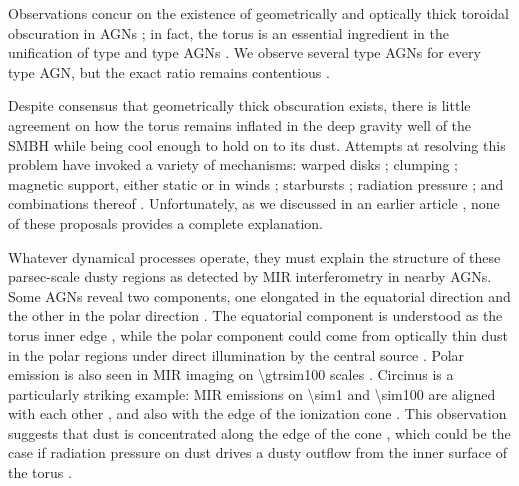 \documentclass[twocolumn]{article}
\newcommand*\citepaliasfirst[1]{%
  \citetext{\citealp{#1}\postnotedelim
  \bibstring{citedas}\addspace\citetalias{#1}}}
\begin{document}
Observations concur on the existence of geometrically and optically thick
toroidal obscuration in \acp{AGN} \citep[e.g.,][]{1985ApJ...297..621A,
1990ApJ...355..456M}; in fact, the torus is an essential ingredient in the
unification of type and type \acp{AGN}
\citep[e.g.,][]{1989ApJ...336..606B, 1993ARA&A..31..473A, 1995PASP..107..803U}.
We observe several type \acp{AGN} for every type
\ac{AGN}, but the exact ratio remains contentious
\citep[e.g.,][]{2008A&A...490..905H, 2010ApJ...714..561L}.

Despite consensus that geometrically thick obscuration exists, there is little
agreement on how the torus remains inflated in the deep gravity well of the
\ac{SMBH} while being cool enough to hold on to its dust. Attempts at resolving
this problem have invoked a variety of mechanisms: warped disks
\citep[e.g.,][]{1989tad..conf..457P, 1989ApJ...347...29S}; clumping
\citep{1988ApJ...329..702K}; magnetic support, either static
\citep{1998A&A...338..856L} or in winds \citep[e.g.,][]{1994ApJ...434..446K,
2006ApJ...648L.101E}; starbursts \citep[e.g.,][]{2009MNRAS.393..759S,
2009ApJ...702...63W}; radiation pressure
\citetext{\citealp[e.g.,][]{1992ApJ...399L..23P, 2008ApJ...679.1018S,
2015ApJ...812...82W, 2016ApJ...819..115D}\multicitedelim\citealp[but
see][]{2016MNRAS.460..980N}}; and combinations thereof
\citep{2012ApJ...749...32K, 2016ApJ...828L..19W}. Unfortunately, as we
discussed in an earlier article \citepaliasfirst{2016ApJ...825...67C}, none of
these proposals provides a complete explanation.

Whatever dynamical processes operate, they must explain the structure of these
parsec-scale dusty regions as detected by \ac{MIR} interferometry in nearby
\acp{AGN}. Some \acp{AGN} reveal two components, one elongated in the
equatorial direction and the other in the polar direction
\citep[e.g.,][]{2004Natur.429...47J, 2009MNRAS.394.1325R, 2014A&A...563A..82T}.
The equatorial component is understood as the torus inner edge
\citep[e.g.,][]{2004Natur.429...47J}, while the polar component could come from
optically thin dust in the polar regions under direct illumination by the
central source \citep{2012ApJ...755..149H}. Polar emission is also seen in
\ac{MIR} imaging on \SI{\gtrsim100}{\parsec} scales
\citep[e.g.,][]{1993ApJ...409L...5B}. Circinus is a particularly striking
example: \Ac{MIR} emissions on \SI{\sim1}{\parsec} and \SI{\sim100}{\parsec}
are aligned with each other \citep{2016ApJ...822..109A}, and also with the edge
of the ionization cone \citep{2005ApJ...618L..17P, 2016ApJ...822..109A}. This
observation suggests that dust is concentrated along the edge of the cone
\citep{2012ApJ...755..149H, 2016ApJ...822..109A}, which could be the case if
radiation pressure on dust drives a dusty outflow from the inner surface of the
torus \citep{2012ApJ...755..149H}.
\end{document}
